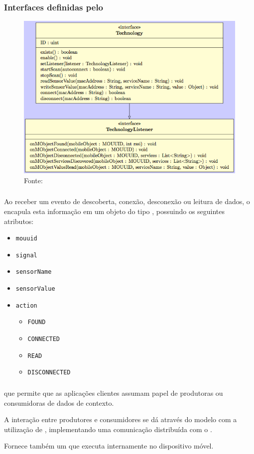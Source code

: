 \documentclass[aspectratio=169]{beamer}
\begin{document}
\begin{frame}
	\frametitle{Interfaces definidas pelo \stwopa}
	\begin{figure}[htb]
		\centering
		\includegraphics[width=0.55\linewidth]{img/technology-interface.png}
		\caption{Fonte: \cite{talavera:et-al:2015}}
	\end{figure}
\end{frame}

\begin{frame}
	\frametitle{\sensordata}
	Ao receber um evento de descoberta, conexão, desconexão ou leitura de dados, o \stwopa encapula esta informação em um objeto do tipo \sensordata, possuindo os seguintes atributos:
	\begin{itemize}
		\item \texttt{mouuid}

		\item \texttt{signal}

		\item \texttt{sensorName}

		\item \texttt{sensorValue}
			
		\item \texttt{action}
		\begin{itemize}

			\item \texttt{FOUND}

			\item \texttt{CONNECTED}

			\item \texttt{READ}

			\item \texttt{DISCONNECTED}

		\end{itemize}
	\end{itemize}
\end{frame}

\begin{frame}
	\frametitle{\cddl}
	\Middleware \iomt que permite que as aplicações clientes assumam papel de produtoras ou consumidoras de dados de contexto.
	
	\bigskip
	A interação entre produtores e consumidores se dá através do modelo \pubsub com a utilização de \brokers, implementando uma comunicação distribuída com o \mqtt.
	\bigskip
	
	Fornece também um \ubroker que executa internamente no dispositivo móvel.
\end{frame}
\end{document}

